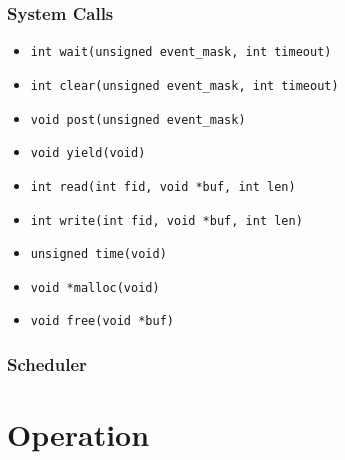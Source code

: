 \documentclass{gqtekspec}
\begin{document}
\subsection{System Calls}
\begin{itemize}
\item {\tt int wait(unsigned event\_mask, int timeout)}
\item {\tt int clear(unsigned event\_mask, int timeout)}
\item {\tt void post(unsigned event\_mask)}
\item {\tt void yield(void) }
\item {\tt int read(int fid, void *buf, int len)}
\item {\tt int write(int fid, void *buf, int len)}
\item {\tt unsigned time(void) }
\item {\tt void *malloc(void)}
\item {\tt void free(void *buf)}
\end{itemize}
\subsection{Scheduler}

\chapter{Operation}\label{ch:operation}
\end{document}
